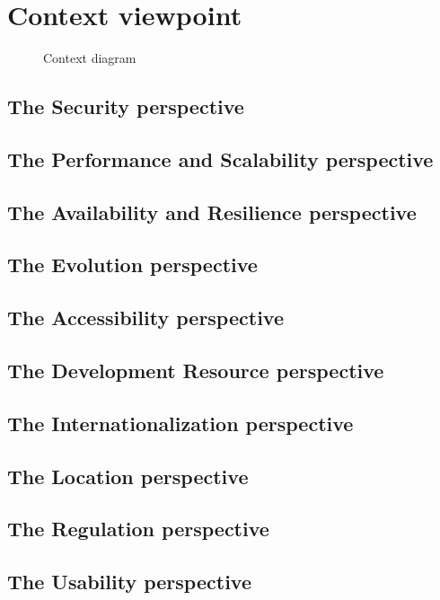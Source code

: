 \section{Context viewpoint}

\begin{figure}[H]
  \label{fig:viewpoint-context-main}
  \caption{Context diagram}
\end{figure}

\subsection*{The Security perspective}

\subsection*{The Performance and Scalability perspective}

\subsection*{The Availability and Resilience perspective}

\subsection*{The Evolution perspective}

\subsection*{The Accessibility perspective}

\subsection*{The Development Resource perspective}

\subsection*{The Internationalization perspective}

\subsection*{The Location perspective}

\subsection*{The Regulation perspective}

\subsection*{The Usability perspective}
